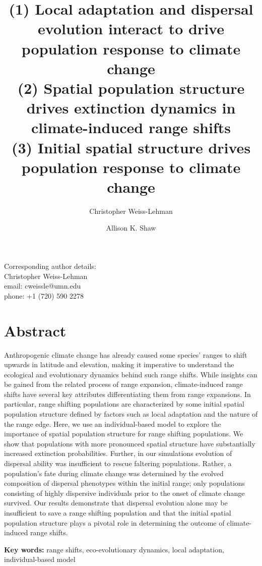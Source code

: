 \documentclass[12pt, oneside]{article}
\title{(1) Local adaptation and dispersal evolution interact to drive population response to climate change \\ (2) Spatial population structure drives extinction dynamics in climate-induced range shifts \\ (3) Initial spatial structure drives population response to climate change}
\date{}
\author[1,*]{Christopher Weiss-Lehman}
\author[1]{Allison K. Shaw}
\affil[1]{Ecology, Evolution, and Behavior, University of Minnesota}
\affil[*]{Denotes corresponding author}
\begin{document}
\maketitle

\begin{flushleft}
Corresponding author details: \\
Christopher Weiss-Lehman \\
email: cweissle@umn.edu \\
phone: +1 (720) 590 2278 \\
\end{flushleft}

\doublespacing
\linenumbers

\newpage

\section*{Abstract}
Anthropogenic climate change has already caused some species' ranges to shift upwards in latitude and elevation, making it imperative to understand the ecological and evolutionary dynamics behind such range shifts. While insights can be gained from the related process of range expansion, climate-induced range shifts have several key attributes differentiating them from range expansions. In particular, range shifting populations are characterized by some initial spatial population structure defined by factors such as local adaptation and the nature of the range edge. Here, we use an individual-based model to explore the importance of spatial population structure for range shifting populations. We show that populations with more pronounced spatial structure have substantially increased extinction probabilities. Further, in our simulations evolution of dispersal ability was insufficient to rescue faltering populations. Rather, a population's fate during climate change was determined by the evolved composition of dispersal phenotypes within the initial range; only populations consisting of highly dispersive individuals prior to the onset of climate change survived. Our results demonstrate that dispersal evolution alone may be insufficient to save a range shifting population and that the initial spatial population structure plays a pivotal role in determining the outcome of climate-induced range shifts.

\begin{flushleft}
\textbf{Key words:} range shifts, eco-evolutionary dynamics, local adaptation, individual-based model
\end{flushleft}
\end{document}
